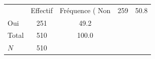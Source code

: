 {
\def\sym#1{\ifmmode^{#1}\else\(^{#1}\)\fi}
\begin{tabular}{l*{1}{cc}}
\toprule
            &    Effectif&Fréquence (%
\midrule
Non         &         259&        50.8\\
Oui         &         251&        49.2\\
Total       &         510&       100.0\\
\midrule
\(N\)       &         510&            \\
\bottomrule
\end{tabular}
}
